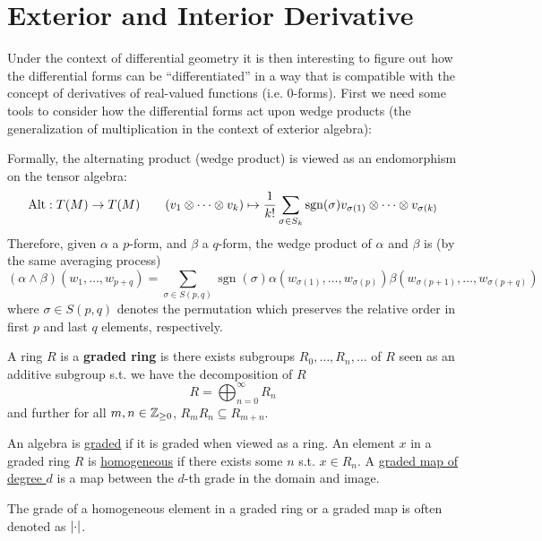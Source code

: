 \documentclass{article}
\begin{document}
\section{Exterior and Interior Derivative}

\textstart
Under the context of differential geometry it is then interesting to figure out how the differential forms can be ``differentiated'' in a way that is compatible with the concept of derivatives of real-valued functions (i.e. $0$-forms). First we need some tools to consider how the differential forms act upon wedge products (the generalization of multiplication in the context of exterior algebra):

\begin{remark}\label{rmk: wedge of differential forms}
    Formally, the alternating product (wedge product) is viewed as an endomorphism on the tensor algebra:
    \[
        \operatorname{Alt}: T(M) \to T(M) \qquad (v_1 \otimes \cdots \otimes v_k) \mapsto \frac{1}{k!} \sum_{\sigma \in S_k} \operatorname{sgn}(\sigma) v_{\sigma(1)} \otimes \cdots \otimes v_{\sigma(k)}
    \]
    Therefore, given $\alpha$ a $p$-form, and $\beta$ a $q$-form, the wedge product of $\alpha$ and $\beta$ is (by the same averaging process)
    \[
        (\alpha\wedge\beta)(w_1, \dots, w_{p+q}) = \sum_{\sigma \in S(p, q)} \operatorname{sgn}(\sigma) \alpha(w_{\sigma(1)}, \dots, w_{\sigma(p)}) \beta(w_{\sigma(p+1)}, \dots, w_{\sigma(p+q)})
    \]
    where $\sigma \in S(p, q)$ denotes the permutation which preserves the relative order in first $p$ and last $q$ elements, respectively. 
\end{remark}

\begin{definition}
    A ring $R$ is a \textbf{graded ring} is there exists subgroups $R_0, \dots, R_n, \dots$ of $R$ seen as an additive subgroup s.t. we have the decomposition of $R$
    \[
        R = \bigoplus_{n = 0} ^ {\infty} R_n
    \]
    and further for all $m, n \in \mathbb{Z}_{\geq 0}$, $R_m R_n \subseteq R_{m + n}$. 

    An algebra is \underline{graded} if it is graded when viewed as a ring. An element $x$ in a graded ring $R$ is \underline{homogeneous} if there exists some $n$ s.t. $x \in R_n$. A \underline{graded map of degree $d$} is a map between the $d$-th grade in the domain and image. 
\end{definition}

\begin{notation}
    The grade of a homogeneous element in a graded ring or a graded map is often denoted as $\left|\cdot\right|$.
\end{notation}
\end{document}
